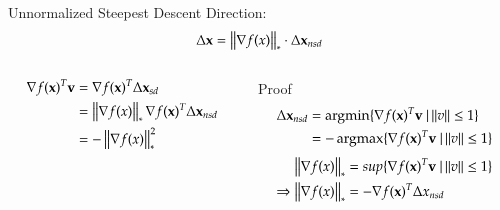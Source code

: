 \begin{frame}
{    Unnormalized Steepest Descent Direction:
    $$\Delta {\bf x} = \left\lVert\nabla f(x)\right\rVert_* \cdot \Delta {\bf x}_{nsd}$$
    \begin{columns}
      \begin{column}{0.4\textwidth}
        \footnotesize
        \begin{equation*}
          \label{eq:some}
          \begin{split}
            \nabla f({\bf x})^T{\bf v} & = \nabla f({\bf x})^T\Delta{\bf x}_{sd} \\
            & =\left\lVert\nabla f(x)\right\rVert_*\nabla f({\bf x})^T\Delta{\bf x}_{nsd} \\
            & = -\left\lVert\nabla f{(x)}\right\rVert^2_*
          \end{split}
        \end{equation*}
      \end{column}
      \begin{column}{0.6\textwidth}
        \footnotesize
        \begin{greenblock}{Proof}
          \begin{equation*}
            \begin{split}
              \Delta {\bf x}_{nsd} & = \operatorname*{argmin}\{\nabla f({\bf x})^T{\bf v} ~| \left\lVert v\right\rVert \le 1\} \\
              & = - \operatorname*{argmax}\{\nabla f({\bf x})^T{\bf v} ~| \left\lVert v\right\rVert \le 1\}
            \end{split}
          \end{equation*}
          \begin{equation*}
            \begin{split}
              \left\lVert\nabla f{(x)}\right\rVert_* & = sup\{\nabla f({\bf x})^T{\bf v}~ |
              \left\lVert v\right\rVert \le 1 \} \\
              \Rightarrow \left\lVert\nabla f{(x)}\right\rVert_* & = -\nabla f({\bf x})^T\Delta x_{nsd}
            \end{split}
          \end{equation*}
        \end{greenblock}
      \end{column}
    \end{columns}

  }


\end{frame}
